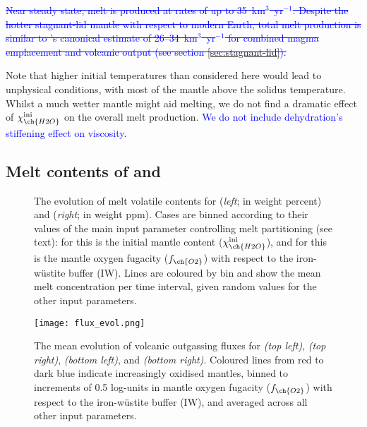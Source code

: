\documentclass[3p,authoryear]{elsarticle}
\newcommand{\editthree}[2]{\textcolor{blue}{\sout{#1}#2}}
\begin{document}
\editthree{Near steady state, melt is produced at rates of up to 35~km$^3$~yr$^{-1}$. Despite the hotter stagnant-lid mantle with respect to modern Earth, total melt production is similar to \citeauthor{Crisp1984}'s \citeyear{Crisp1984} canonical estimate of 26--34~km$^3$~yr$^{-1}$ for combined magma emplacement and volcanic output (see section \ref{sec:stagnant-lid}).}{}

Note that higher initial temperatures than considered here would lead to unphysical conditions, with most of the mantle above the solidus temperature. Whilst a much wetter mantle might aid melting, we do not find a dramatic effect of $\chi_{\ch{H2O}}^{\rm ini}$ on the overall melt production. \editthree{}{We do not include dehydration's stiffening effect on viscosity.}


\subsection{Melt contents of  and }


\begin{figure}%
    \centering
    \qquad
    \caption{The evolution of melt volatile contents for  (\textit{left}; in weight percent) and  (\textit{right}; in weight ppm). Cases are binned according to their values of the main input parameter controlling melt partitioning (see text): for  this is the initial mantle  content ($\chi_{\ch{H2O}}^{\rm{ini}}$), and for  this is the mantle oxygen fugacity ($f_{\ch{O2}}$) with respect to the iron-w\"ustite buffer (IW). Lines are coloured by bin and show the mean melt concentration per time interval, given random values for the other input parameters.}%
    \label{fig:X_melt}%
\end{figure}



\begin{figure}
    \centering
    \texttt{[image: flux\_evol.png]}
    \caption{The mean evolution of volcanic outgassing fluxes for  \textit{(top left)},  \textit{(top right)},  \textit{(bottom left)}, and  \textit{(bottom right)}. Coloured lines from red to dark blue indicate increasingly oxidised mantles, binned to increments of 0.5 log-units in mantle oxygen fugacity ($f_{\ch{O2}}$) with respect to the iron-w\"ustite buffer (IW), and averaged across all other input parameters. }
    \label{fig:fO2_flux}
\end{figure}
\end{document}
